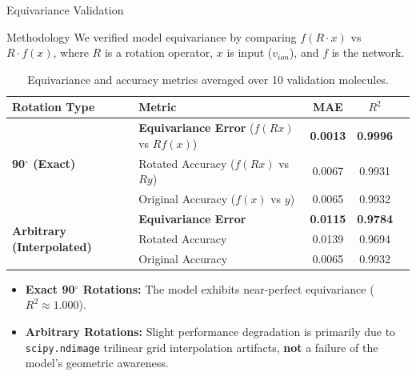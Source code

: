 \documentclass[aspectratio=169]{beamer}
\begin{document}
\begin{frame}{Equivariance Validation}
  \begin{block}{Methodology}
    We verified model equivariance by comparing $f(R\cdot x)$ vs $R \cdot f(x)$, where $R$ is a rotation operator, $x$ is input ($v_{ion}$), and $f$ is the network.
  \end{block}

  \begin{table}[h]
    \centering
    \scriptsize
    \caption{Equivariance and accuracy metrics averaged over 10 validation molecules.}
    \begin{tabular}{llccc}
    \toprule
    Rotation Type & Metric & MAE & $R^2$ \\
    \midrule
    \multirow{3}{*}{\textbf{90$^\circ$ (Exact)}} & \textbf{Equivariance Error} ($f(R x)$ vs $R f(x)$) & \textbf{0.0013} & \textbf{0.9996} \\
                                              & Rotated Accuracy ($f(R x)$ vs $R y$) & 0.0067 & 0.9931 \\
                                              & Original Accuracy ($f(x)$ vs $y$) & 0.0065 & 0.9932 \\
    \midrule
    \multirow{3}{*}{\textbf{Arbitrary (Interpolated)}} & \textbf{Equivariance Error} & \textbf{0.0115} & \textbf{0.9784} \\
                                                    & Rotated Accuracy & 0.0139 & 0.9694 \\
                                                    & Original Accuracy & 0.0065 & 0.9932 \\
    \bottomrule
    \end{tabular}
  \end{table}

  \begin{itemize}
      \item \textbf{Exact 90$^\circ$ Rotations:} The model exhibits near-perfect equivariance ($R^2 \approx 1.000$).
      \item \textbf{Arbitrary Rotations:} Slight performance degradation is primarily due to \texttt{scipy.ndimage} trilinear grid interpolation artifacts, \textbf{not} a failure of the model's geometric awareness.
  \end{itemize}
\end{frame}
\end{document}
